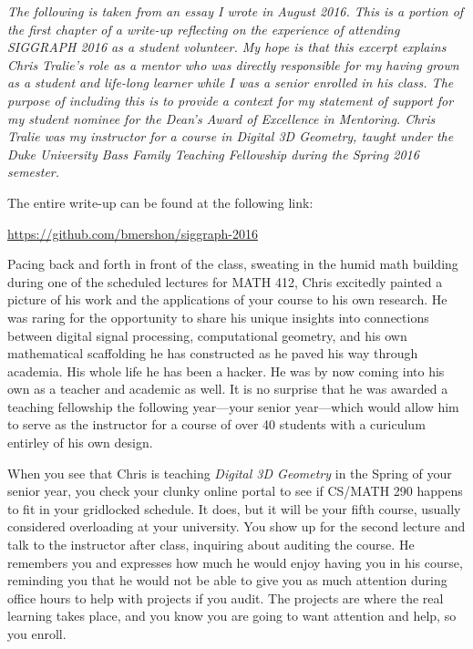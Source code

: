 \documentclass[a4paper, 11pt]{article} %
\begin{document}
\textit{The following is taken from an essay I wrote in August 2016. This is a portion of the first chapter of a write-up reflecting on the experience of attending SIGGRAPH 2016 as a student volunteer. My hope is that this excerpt explains Chris Tralie's role as a mentor who was directly responsible for my having grown as a student and life-long learner while I was a senior enrolled in his class. The purpose of including this is to provide a context for my statement of support for my student nominee for the Dean's Award of Excellence in Mentoring. Chris Tralie was my instructor for a course in Digital 3D Geometry, taught under the Duke University Bass Family Teaching Fellowship during the Spring 2016 semester.}
	
\bigskip

The entire write-up can be found at the following link:

\begin{center}
\url{https://github.com/bmershon/siggraph-2016}
\end{center}

\begin{center}
	\textellipsis
\end{center}

 Pacing back and forth in front of the class, sweating in the humid math building during one of the scheduled lectures for MATH 412, Chris excitedly painted a picture of his work and the applications of your course to his own research. He was raring for the opportunity to share his unique insights into connections between digital signal processing, computational geometry, and his own mathematical scaffolding he has constructed as he paved his way through academia. His whole life he has been a hacker. He was by now coming into his own as a teacher and academic as well. It is no surprise that he was awarded a teaching fellowship the following year---your senior year---which would allow him to serve as the instructor for a course of over 40 students with a curiculum entirley of his own design.
 
When you see that Chris is teaching \textit{Digital 3D Geometry} in the Spring of your senior year, you check your clunky online portal to see if CS/MATH 290 happens to fit in your gridlocked schedule. It does, but it will be your fifth course, usually considered overloading at your university. You show up for the second lecture and talk to the instructor after class, inquiring about auditing the course. He remembers you and expresses how much he would enjoy having you in his course, reminding you that he would not be able to give you as much attention during office hours to help with projects if you audit. The projects are where the real learning takes place, and you know you are going to want attention and help, so you enroll.
\end{document}
